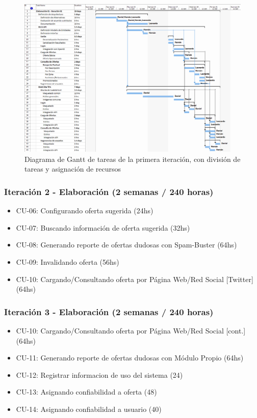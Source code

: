 	\begin{figure}[hbtp]
	\centering
	\includegraphics[scale=0.8]{./TP2Planificacion.gif}
	\caption{Diagrama de Gantt de tareas de la primera iteraci\'on, con divisi\'on de tareas y asignaci\'on de recursos}
	\label{fig:gantt}
	\end{figure}

\subsubsection{Iteraci\'on 2 - Elaboraci\'on (2 semanas / 240 horas)}
	
	\begin{itemize}
	  \item CU-06: Configurando oferta sugerida (24hs)
	  \item CU-07: Buscando información de oferta sugerida (32hs)
	  \item CU-08: Generando reporte de ofertas dudosas con Spam-Buster (64hs)
	  \item CU-09: Invalidando oferta (56hs)
	  \item CU-10: Cargando/Consultando oferta por P\'agina Web/Red Social [Twitter] (64hs)
	\end{itemize}

\subsubsection{Iteraci\'on 3 - Elaboraci\'on (2 semanas / 240 horas)}
	
	\begin{itemize}
		\item CU-10: Cargando/Consultando oferta por P\'agina Web/Red Social [cont.] (64hs)
		\item CU-11: Generando reporte de ofertas dudosas con M\'odulo Propio (64hs)
		\item CU-12: Registrar informacion de uso del sistema (24)
		\item CU-13: Asignando confiabilidad a oferta (48)
		\item CU-14: Asignando confiabilidad a usuario (40)
	\end{itemize}

